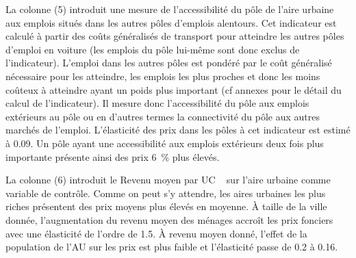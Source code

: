\documentclass[10.5pt,a4paper]{article}
\begin{document}
{La colonne (5) introduit une mesure de l'accessibilité du pôle de l'aire urbaine aux emplois situés dans les autres pôles d'emplois alentours. Cet indicateur est calculé à partir des coûts généralisés de transport pour atteindre les autres pôles d'emploi en voiture (les emplois du pôle lui-même sont donc exclus de l'indicateur). L'emploi dans les autres pôles est pondéré par le coût généralisé nécessaire pour les atteindre, les emplois les plus proches et donc les moins coûteux à atteindre ayant un poids plus important (cf annexes pour le détail du calcul de l'indicateur). Il mesure donc l'accessibilité du pôle aux emplois extérieurs au pôle ou en d'autres termes la connectivité du pôle aux autres marchés de l'emploi. L'élasticité des prix dans les pôles à cet indicateur est estimé à 0.09. Un pôle ayant une accessibilité aux emplois extérieurs deux fois plus importante présente ainsi des prix 6~\% plus élevés.\par   


La colonne (6) introduit le \og Revenu moyen par UC \fg~ sur l'aire urbaine comme variable de contrôle. Comme on peut s'y attendre, les aires urbaines les plus riches présentent des prix moyens plus élevés en moyenne. \`{A} taille de la ville donnée, l'augmentation du revenu moyen des ménages accroît les prix fonciers avec une élasticité de l'ordre de 1.5. \`{A} revenu moyen donné, l'effet de la population de l'AU sur les prix est plus faible et l'élasticité passe de 0.2 à 0.16. \par  

}
\end{document}
